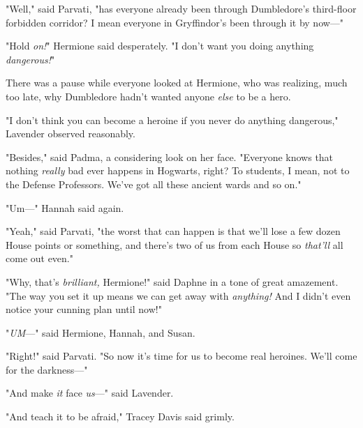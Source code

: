 "Well," said Parvati, "has everyone already been through Dumbledore's
third-floor forbidden corridor? I mean everyone in Gryffindor's been through it
by now---"

"Hold \emph{on!}" Hermione said desperately. "I don't want you doing anything
\emph{dangerous!}"

There was a pause while everyone looked at Hermione, who was realizing, much
too late, why Dumbledore hadn't wanted anyone \emph{else} to be a hero.

"I don't think you can become a heroine if you never do anything dangerous,"
Lavender observed reasonably.

"Besides," said Padma, a considering look on her face. "Everyone knows that
nothing \emph{really} bad ever happens in Hogwarts, right? To students, I mean,
not to the Defense Professors. We've got all these ancient wards and so on."

"Um---" Hannah said again.

"Yeah," said Parvati, "the worst that can happen is that we'll lose a few dozen
House points or something, and there's two of us from each House so
\emph{that'll} all come out even."

"Why, that's \emph{brilliant,} Hermione!" said Daphne in a tone of great
amazement. "The way you set it up means we can get away with \emph{anything!}
And I didn't even notice your cunning plan until now!"

"\emph{UM}---" said Hermione, Hannah, and Susan.

"Right!" said Parvati. "So now it's time for us to become real heroines. We'll
come for the darkness---"

"And make \emph{it} face \emph{us}---" said Lavender.

"And teach it to be afraid," Tracey Davis said grimly.
